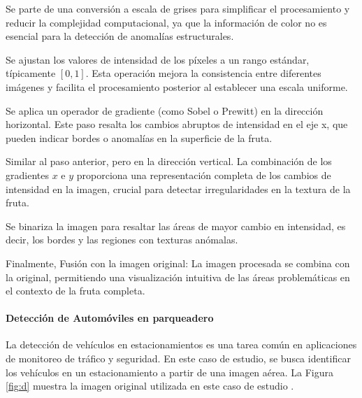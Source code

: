 \begin{seriate}

    
    \item Se parte de una conversión a escala de grises para simplificar el procesamiento y reducir la complejidad computacional, ya que la información de color no es esencial para la detección de anomalías estructurales.
    
    \item Se ajustan los valores de intensidad de los píxeles a un rango estándar, típicamente \( [0, 1] \). Esta operación mejora la consistencia entre diferentes imágenes y facilita el procesamiento posterior al establecer una escala uniforme.
    
    \item Se aplica un operador de gradiente (como Sobel o Prewitt) en la dirección horizontal. Este paso resalta los cambios abruptos de intensidad en el eje x, que pueden indicar bordes o anomalías en la superficie de la fruta.
    
    \item Similar al paso anterior, pero en la dirección vertical. La combinación de los gradientes \( x \) e \( y \) proporciona una representación completa de los cambios de intensidad en la imagen, crucial para detectar irregularidades en la textura de la fruta.
    
    \item Se binariza la imagen para resaltar las áreas de mayor cambio en intensidad, es decir, los bordes y las regiones con texturas anómalas.
    
    \item Finalmente, Fusión con la imagen original: La imagen procesada se combina con la original, permitiendo una visualización intuitiva de las áreas problemáticas en el contexto de la fruta completa.
    
    \end{seriate}

\paragraph{Detección de Automóviles en parqueadero} La detección de vehículos en estacionamientos es una tarea común en aplicaciones de monitoreo de tráfico y seguridad. En este caso de estudio, se busca identificar los vehículos en un estacionamiento a partir de una imagen aérea. La Figura \ref{fig:d} muestra la imagen original utilizada en este caso de estudio \autocite{pklot-raw_dataset}.

